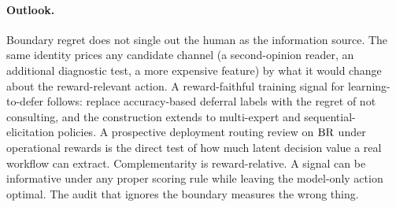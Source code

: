 \paragraph{Outlook.}
Boundary regret does not single out the human as the information source.
The same identity prices any candidate channel (a second-opinion reader, an additional diagnostic test, a more expensive feature) by what it would change about the reward-relevant action.
A reward-faithful training signal for learning-to-defer follows: replace accuracy-based deferral labels with the regret of not consulting, and the construction extends to multi-expert and sequential-elicitation policies.
A prospective deployment routing review on $\operatorname{BR}$ under operational rewards is the direct test of how much latent decision value a real workflow can extract.
Complementarity is reward-relative. A signal can be informative under any proper scoring rule while leaving the model-only action optimal. The audit that ignores the boundary measures the wrong thing.


